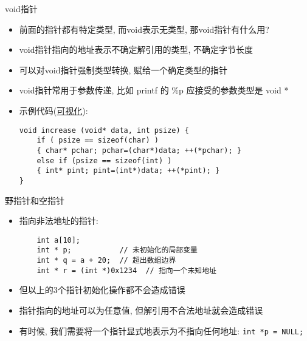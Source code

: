 \begin{frame}[fragile]{void指针}
    \begin{itemize}[<+- | alert@+>]
        \item 前面的指针都有特定类型, 而void表示无类型, 那void指针有什么用?
        \item void指针指向的地址表示不确定解引用的类型, 不确定字节长度
        \item 可以对void指针强制类型转换, 赋给一个确定类型的指针
        \item void指针常用于参数传递, 比如 printf 的 \%p 应接受的参数类型是 void *
        \item 示例代码(\href{http://pythontutor.com/c.html#code=\%23include\%20\%3Cstdio.h\%3E\%0A\%0Avoid\%20increase\%28void\%20*data,\%20int\%20psize\%29\%20\%7B\%0A\%20\%20if\%20\%28psize\%20\%3D\%3D\%20sizeof\%28char\%29\%29\%20\%7B\%0A\%20\%20\%20\%20char\%20*pchar\%3B\%0A\%20\%20\%20\%20pchar\%20\%3D\%20\%28char\%20*\%29\%20data\%3B\%0A\%20\%20\%20\%20\%2B\%2B\%28*pchar\%29\%3B\%0A\%20\%20\%7D\%20else\%20if\%20\%28psize\%20\%3D\%3D\%20sizeof\%28int\%29\%29\%20\%7B\%0A\%20\%20\%20\%20int\%20*pint\%3B\%0A\%20\%20\%20\%20pint\%20\%3D\%20\%28int\%20*\%29\%20data\%3B\%0A\%20\%20\%20\%20\%2B\%2B\%28*pint\%29\%3B\%0A\%20\%20\%7D\%0A\%7D\%0A\%0Aint\%20main\%28\%29\%20\%7B\%0A\%20\%20char\%20a\%20\%3D\%20'A'\%3B\%0A\%20\%20int\%20b\%20\%3D\%201108\%3B\%0A\%20\%20increase\%28\%26a,\%20sizeof\%28a\%29\%29\%3B\%0A\%20\%20increase\%28\%26b,\%20sizeof\%28b\%29\%29\%3B\%0A\%20\%20printf\%28\%22\%25c\%20\%25d\%5Cn\%22,\%20a,\%20b\%29\%3B\%0A\%20\%20return\%200\%3B\%0A\%7D&mode=edit&origin=opt-frontend.js&py=c&rawInputLstJSON=\%5B\%5D}{可视化}):
        \scriptsize\begin{verbatim}
void increase (void* data, int psize) {
    if ( psize == sizeof(char) )
    { char* pchar; pchar=(char*)data; ++(*pchar); }
    else if (psize == sizeof(int) )
    { int* pint; pint=(int*)data; ++(*pint); }
}
        \end{verbatim}
    \end{itemize}
\end{frame}

\begin{frame}[fragile]{野指针和空指针}
    \begin{itemize}[<+- | alert@+>]
        \item 指向非法地址的指针:
        \scriptsize\begin{verbatim}
    int a[10];
    int * p;           // 未初始化的局部变量
    int * q = a + 20;  // 超出数组边界
    int * r = (int *)0x1234  // 指向一个未知地址
        \end{verbatim}
        \item 但以上的3个指针初始化操作都不会造成错误
        \item 指针指向的地址可以为任意值, 但解引用不合法地址就会造成错误
        \item 有时候, 我们需要将一个指针显式地表示为不指向任何地址: \texttt{int *p = NULL;}
    \end{itemize}
\end{frame}

